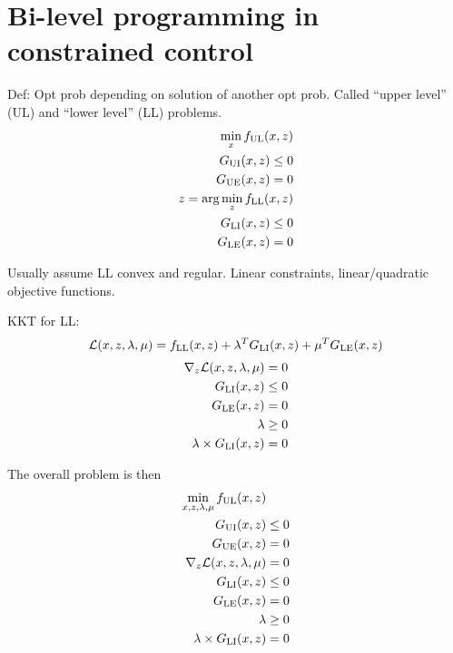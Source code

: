 \section{Bi-level programming in constrained control}
Def: Opt prob depending on solution of another opt prob. Called ``upper level'' (UL) and ``lower level'' (LL) problems.
\begin{equation}
\begin{split}
    \min_x f_\mathrm{UL}(x,z) \\
    G_\mathrm{UI}(x,z) \leq 0 \\
    G_\mathrm{UE}(x,z) = 0 \\
    z = \arg \min_z f_\mathrm{LL}(x,z) \\
    G_\mathrm{LI}(x,z) \leq 0 \\
    G_\mathrm{LE}(x,z) = 0
\end{split}
\end{equation}

Usually assume LL convex and regular. Linear constraints, linear/quadratic objective functions.

KKT for LL:
\begin{equation}
    \mathcal{L}(x,z,\lambda,\mu) = f_\mathrm{LL}(x,z) + \lambda^T G_\mathrm{LI}(x,z) + \mu^T G_\mathrm{LE}(x,z)
\end{equation}
\begin{equation}
\begin{split}
    \nabla_z \mathcal{L}(x,z,\lambda,\mu) = 0 \\
    G_\mathrm{LI}(x,z) \leq 0 \\
    G_\mathrm{LE}(x,z) = 0 \\
    \lambda \geq 0 \\
    \lambda \times G_\mathrm{LI}(x,z) = 0
\end{split}
\end{equation}

The overall problem is then
\begin{equation}
\begin{split}
    \min_{x,z,\lambda,\mu} f_\mathrm{UL}(x,z) & \\
    G_\mathrm{UI}(x,z) & \leq 0 \\
    G_\mathrm{UE}(x,z) &= 0 \\
    \nabla_z \mathcal{L}(x,z,\lambda,\mu) &= 0 \\
    G_\mathrm{LI}(x,z) &\leq 0 \\
    G_\mathrm{LE}(x,z) &= 0 \\
    \lambda &\geq 0 \\
    \lambda \times G_\mathrm{LI}(x,z) &= 0
\end{split}
\end{equation}

